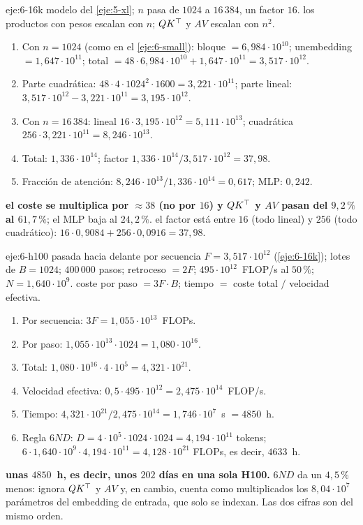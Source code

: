 \begin{solucion}{eje:6-16k}
\datos modelo del \cref{eje:5-xl}; $n$ pasa de $1024$ a $16\,384$, un factor $16$.
\planteamiento los productos con pesos escalan con $n$; $QK^{\top}$ y $AV$ escalan con $n^{2}$.
\pasos
\begin{enumerate}[label=\arabic*.]
  \item Con $n=1024$ (como en el \cref{eje:6-small}): bloque $=6{,}984\cdot 10^{10}$; unembedding $=1{,}647\cdot 10^{11}$; total $=48\cdot 6{,}984\cdot 10^{10}+1{,}647\cdot 10^{11}=3{,}517\cdot 10^{12}$.
  \item Parte cuadrática: $48\cdot 4\cdot 1024^{2}\cdot 1600=3{,}221\cdot 10^{11}$; parte lineal: $3{,}517\cdot 10^{12}-3{,}221\cdot 10^{11}=3{,}195\cdot 10^{12}$.
  \item Con $n=16\,384$: lineal $16\cdot 3{,}195\cdot 10^{12}=5{,}111\cdot 10^{13}$; cuadrática $256\cdot 3{,}221\cdot 10^{11}=8{,}246\cdot 10^{13}$.
  \item Total: $1{,}336\cdot 10^{14}$; factor $1{,}336\cdot 10^{14}/3{,}517\cdot 10^{12}=37{,}98$.
  \item Fracción de atención: $8{,}246\cdot 10^{13}/1{,}336\cdot 10^{14}=0{,}617$; MLP: $0{,}242$.
\end{enumerate}
\resultado \textbf{el coste se multiplica por $\approx 38$ (no por $16$) y $QK^{\top}$ y $AV$ pasan del $9{,}2\,\%$ al $61{,}7\,\%$}; el MLP baja al $24{,}2\,\%$.
\comprobacion el factor está entre $16$ (todo lineal) y $256$ (todo cuadrático): $16\cdot 0{,}9084+256\cdot 0{,}0916=37{,}98$.
\end{solucion}

\begin{solucion}{eje:6-h100}
\datos pasada hacia delante por secuencia $F=3{,}517\cdot 10^{12}$ (\cref{eje:6-16k}); lotes de $B=1024$; $400\,000$ pasos; retroceso $=2F$; $495\cdot 10^{12}$~FLOP/s al $50\,\%$; $N=1{,}640\cdot 10^{9}$.
\planteamiento coste por paso $=3F\cdot B$; tiempo $=$ coste total $/$ velocidad efectiva.
\pasos
\begin{enumerate}[label=\arabic*.]
  \item Por secuencia: $3F=1{,}055\cdot 10^{13}$~FLOPs.
  \item Por paso: $1{,}055\cdot 10^{13}\cdot 1024=1{,}080\cdot 10^{16}$.
  \item Total: $1{,}080\cdot 10^{16}\cdot 4\cdot 10^{5}=4{,}321\cdot 10^{21}$.
  \item Velocidad efectiva: $0{,}5\cdot 495\cdot 10^{12}=2{,}475\cdot 10^{14}$~FLOP/s.
  \item Tiempo: $4{,}321\cdot 10^{21}/2{,}475\cdot 10^{14}=1{,}746\cdot 10^{7}$~s $=4850$~h.
  \item Regla $6ND$: $D=4\cdot 10^{5}\cdot 1024\cdot 1024=4{,}194\cdot 10^{11}$ tokens; $6\cdot 1{,}640\cdot 10^{9}\cdot 4{,}194\cdot 10^{11}=4{,}128\cdot 10^{21}$ FLOPs, es decir, $4633$~h.
\end{enumerate}
\resultado \textbf{unas $4850$~h, es decir, unos $202$ días en una sola H100.}
\comprobacion $6ND$ da un $4{,}5\,\%$ menos: ignora $QK^{\top}$ y $AV$ y, en cambio, cuenta como multiplicados los $8{,}04\cdot 10^{7}$ parámetros del embedding de entrada, que solo se indexan. Las dos cifras son del mismo orden.
\end{solucion}

